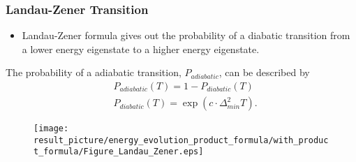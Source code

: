 \documentclass{beamer}
\begin{document}

\begin{frame}
	\frametitle{Landau-Zener Transition}
	\begin{itemize}
		\item Landau-Zener formula gives out the probability of a diabatic transition from a lower energy eigenstate to a higher energy eigenstate.

	\end{itemize}
	The probability of a adiabatic transition, $P_{adiabatic}$, can be described by 
	\begin{equation*}
	\begin{split}
	&P_{adiabatic}(T) = 1-P_{diabatic}(T)\\
	&P_{diabatic}(T) = \exp(c\cdot \Delta_{min}^2 T).
	\end{split}
	\end{equation*}
	\begin{figure}
		\centering
		\texttt{[image: result\_picture/energy\_evolution\_product\_formula/with\_product\_formula/Figure\_Landau\_Zener.eps]}
		
	\end{figure}
	
\end{frame}
\end{document}

